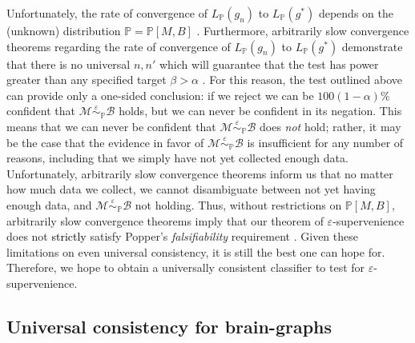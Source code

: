 \documentclass{article}
\newcommand{\mB}{\mathcal{B}}
\newcommand{\mM}{\mathcal{M}}
\newcommand{\PP}{\mathbb{P}}           %
\newcommand{\Real}{\mathbb{R}}           %
\newcommand{\eps}{\varepsilon}
\providecommand{\mc}[1]{\mathcal{#1}}
\newcommand{\MeB}{\mM \overset{\varepsilon}{{\sim}}_{\PP} \mB}
\providecommand{\tr}[1]{\textcolor{black}{#1}}
\begin{document}
Unfortunately, the rate of convergence of $L_{\PP}(g_n)$ to $L_{\PP}(g^*)$ depends on the (unknown) distribution $\PP=\PP[M,B]$ \cite{DGL96}. Furthermore, arbitrarily slow convergence theorems regarding the rate of convergence of $L_{\PP}(g_n)$ to $L_{\PP}(g^*)$ demonstrate that there is no universal $n,n'$ which will guarantee that the test has power greater than any specified target $\beta > \alpha$ \cite{Devroye83}. For this reason, the test outlined above can provide only a one-sided conclusion: if we reject we can be $100(1-\alpha)$\% confident that $\MeB$ holds, but we can never be confident in its negation.  This means that we can never be confident that $\MeB$ does \emph{not} hold; rather, it may be the case that the evidence in favor of $\MeB$ is insufficient for any number of reasons, including that we simply have not yet collected enough data. Unfortunately, arbitrarily slow convergence theorems inform us that no matter how much data we collect, we cannot disambiguate between not yet having enough data, and $\MeB$ not holding.  Thus, without restrictions on $\PP[M,B]$, arbitrarily slow convergence theorems imply that our theorem of $\varepsilon$-supervenience does not \tr{strictly} satisfy Popper's {\it falsifiability} requirement \cite{Popper}. Given these limitations on even universal consistency, it is still the best one can hope for.  Therefore, we hope to obtain a universally consistent classifier to test for $\eps$-supervenience.



\subsection{Universal consistency for brain-graphs} %
\label{sub:uc}

\end{document}
